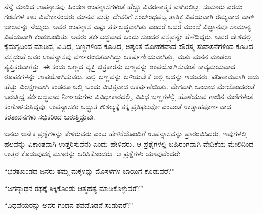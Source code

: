 ನೆನ್ನೆ ಮಾಡಿದ ಉಪನ್ಯಾಸವು ಹಿಂದಣ ಉಪನ್ಯಾಸಗಳಂತೆ ಹೆಚ್ಚು ವಿವರಣಾತ್ಮಕ ವಾಗಿರಲಿಲ್ಲ. ಸುಮಾರು ಎರಡು ಗಂಟೆಗಳ ಕಾಲ ವಿವೇಕಾನಂದರು ಮಾನವ ಮತ್ತು ದೇವರಿಗೆ ಸಂಬ್ಂಧಪಟ್ಟ ತಾತ್ತ್ವಿಕ ವಿಷಯವಾಗಿ ರಮ್ಯವಾದ ವಾಗ್​ಜಾಲವನ್ನು ನೆಯ್ದರು. ಅವರ ಉಪನ್ಯಾಸ ಎಷ್ಟು ತರ್ಕಬದ್ಧವಾಗಿತ್ತು ಎಂದರೆ ಅದರ ಮುಂದೆ ವಿಜ್ಞಾನವೂ ಸಾಮಾನ್ಯ ವಿಷಯವಾಗಿ ಕಂಡುಬಂದಿತು. ಅವರು ತರ್ಕಬದ್ಧವಾದ ಒಂದು ಸುಂದರ ವಸ್ತ್ರವನ್ನೇ ಹೆಣೆದಿದ್ದರು. ಅವರ ದೇಶದಲ್ಲಿ ಕೈಮಗ್ಗದಿಂದ ಮಾಡಿದ, ವಿವಿಧ, ಬಣ್ಣಗಳಿಂದ ಕೂಡಿದ, ಅತ್ಯಂತ ಮೋಹಕವಾದ ಪೌರಸ್ತ್ಯ ಸುವಾಸನೆಗಳಿಂದ ಕೂಡಿದ ವಸ್ತ್ರದಂತೆ ಅವರ ಉಪನ್ಯಾಸವು ವರ್ಣರಂಜಿತವಾಗಿದ್ದು ಆಕರ್ಷಣೀಯವಾಗಿತ್ತು, ಮತ್ತು ಮನನ ಮಾಡಲು ತೃಪ್ತಿಕರವಾಗತ್ತು. ಈ ಕಂದು ಬಣ್ಣದ ವ್ಯಕ್ತಿ ಚಿತ್ರಕಾರನು ಬಣ್ಣವನ್ನು ಉಪಯೋಗಿಸುವಂತೆ ಕಾವ್ಯಮಯವಾದ ರೂಪಕಗಳನ್ನು ಉಪಯೋಗಿಸುವರು. ಎಲ್ಲಿ ಬಣ್ಣವನ್ನು ಬಳಿಯಬೇಕೆ ಅಲ್ಲಿ ಅದನ್ನು ಇಡುವರು. ಪರಿಣಾಮವಾಗಿ ಅದು ಹೆಚ್ಚು ವಿಲಕ್ಷಣವಾಗಿ ಕಂಡರೂ ಅಲ್ಲಿ ಒಂದು ವಿಚಿತ್ರವಾದ ಆಕರ್ಷಣೆಯಿತ್ತು. ವೇಗವಾಗಿ ಒಂದಾದ ಮೇಲೊಂದರಂತೆ ಬರುತ್ತಿದ್ದ ತರ್ಕಬದ್ಧವಾದ ನಿರ್ಣಯಗಳು ವಿವಿಧಾಕಾರದಲ್ಲಿ, ವಿವಿಧ ಬಣ್ಣಗಳಲ್ಲಿ ಹೊಳೆಯುವ ಗಾಜಿನ ಮಣಿಗಳಂತೆ ಕಂಗೊಳಿಸುತ್ತಿದ್ದವು. ಉಪನ್ಯಾಸಕರ ಅದ್ಭುತ ಕೌಶಲ್ಯಕ್ಕೆ ತಕ್ಕ ಪ್ರತಿಫಲವೋ ಎಂಬಂತೆ ಉತ್ಸಾಹಪೂರ್ಣವಾದ ಕರತಾಡನಗಳು ಸಭಿಕರಿಂದ ಬರುತ್ತಿದ್ದುವು.

ಜನರು ಅನೇಕ ಪ್ರಶ್ನೆಗಳನ್ನು ಕೇಳಿರುವರು ಎಂಬ ಹೇಳಿಕೆಯೊಂದಿಗೆ ಉಪನ್ಯಾಸವನ್ನು ಪ್ರಾರಂಭಿಸಿದರು. ಇವುಗಳಲ್ಲಿ ಹಲವನ್ನು ಏಕಾಂತವಾಗಿ ಉತ್ತರಿಸುವೆನು ಎಂದು ಹೇಳಿದರು. ಆ ಪ್ರಶ್ನೆಗಳಲ್ಲಿ ಬಹಿರಂಗವಾಗಿ ವೇದಿಕೆಯ ಮೇಲಿನಿಂದ ಉತ್ತರ ಕೊಡುವುದಕ್ಕೆ ಮೂರನ್ನು ಆರಿಸಿಕೊಂಡರು. ಆ ಪ್ರಶ್ನೆಗಳು ಯಾವುವೆಂದರೆ:

\begin{myquote}
“ಭರತಖಂಡದ ಜನರು ತಮ್ಮ ಮಕ್ಕಳನ್ನು ಮೊಸಳೆಗಳ ಬಾಯಿಗೆ ಕೊಡುವರೆ?”
\end{myquote}

\begin{myquote}
“ಜಗನ್ನಾಥನ ರಥಕ್ಕೆ ಸಿಕ್ಕಿಕೊಂಡು ಆತ್ಮಹತ್ಯೆ ಮಾಡಿಕೊಳ್ಳುವರೆ?”
\end{myquote}

\begin{myquote}
“ವಿಧವೆಯರನ್ನು ಅವರ ಗಂಡನ ಶವದೊಡನೆ ಸುಡುವರೆ?”
\end{myquote}


